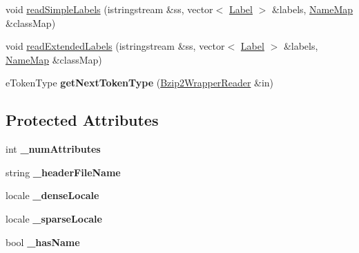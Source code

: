 \begin{DoxyCompactItemize}
\item 
void \hyperlink{classMultiBoost_1_1ArffParserBzip2_a2ed2111888effa577d2e0fc9cc60f517}{read\-Simple\-Labels} (istringstream \&ss, vector$<$ \hyperlink{structMultiBoost_1_1Label}{Label} $>$ \&labels, \hyperlink{classMultiBoost_1_1NameMap}{Name\-Map} \&class\-Map)
\item 
void \hyperlink{classMultiBoost_1_1ArffParserBzip2_a80a6e220bf0a47694ea8406ab4cbcca5}{read\-Extended\-Labels} (istringstream \&ss, vector$<$ \hyperlink{structMultiBoost_1_1Label}{Label} $>$ \&labels, \hyperlink{classMultiBoost_1_1NameMap}{Name\-Map} \&class\-Map)
\item 
\hypertarget{classMultiBoost_1_1ArffParserBzip2_a34bb11d0a10cda1458ccb0738dc5694e}{e\-Token\-Type {\bfseries get\-Next\-Token\-Type} (\hyperlink{classBzip2WrapperReader}{Bzip2\-Wrapper\-Reader} \&in)}\label{classMultiBoost_1_1ArffParserBzip2_a34bb11d0a10cda1458ccb0738dc5694e}

\end{DoxyCompactItemize}
\subsection*{Protected Attributes}
\begin{DoxyCompactItemize}
\item 
\hypertarget{classMultiBoost_1_1ArffParserBzip2_aad8ec21f7cd706374d9dd88a9004ffc2}{int {\bfseries \-\_\-num\-Attributes}}\label{classMultiBoost_1_1ArffParserBzip2_aad8ec21f7cd706374d9dd88a9004ffc2}

\item 
\hypertarget{classMultiBoost_1_1ArffParserBzip2_abc163986d8f722ef222db0a061bff735}{string {\bfseries \-\_\-header\-File\-Name}}\label{classMultiBoost_1_1ArffParserBzip2_abc163986d8f722ef222db0a061bff735}

\item 
\hypertarget{classMultiBoost_1_1ArffParserBzip2_a5e847158494abbc442459ed7c7ae943c}{locale {\bfseries \-\_\-dense\-Locale}}\label{classMultiBoost_1_1ArffParserBzip2_a5e847158494abbc442459ed7c7ae943c}

\item 
\hypertarget{classMultiBoost_1_1ArffParserBzip2_ae775845aa9e9520b82438f1c4278c22d}{locale {\bfseries \-\_\-sparse\-Locale}}\label{classMultiBoost_1_1ArffParserBzip2_ae775845aa9e9520b82438f1c4278c22d}

\item 
\hypertarget{classMultiBoost_1_1ArffParserBzip2_a30ad96dd995d4c1cf44fd55411d7b65c}{bool {\bfseries \-\_\-has\-Name}}\label{classMultiBoost_1_1ArffParserBzip2_a30ad96dd995d4c1cf44fd55411d7b65c}

\end{DoxyCompactItemize}
